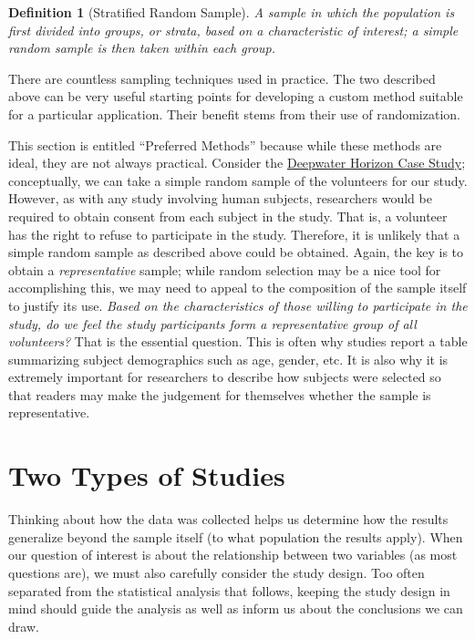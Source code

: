 \documentclass[
]{book}
\theoremstyle{plain}
\theoremstyle{mydefn}
\newtheorem{definition}{Definition}[chapter]
\theoremstyle{myexmpl}
\theoremstyle{remark}
\begin{document}
\begin{definition}[Stratified Random Sample]
\protect\hypertarget{def:defn-stratified-random-sample}{}{\label{def:defn-stratified-random-sample} {} }A sample in which the population is first divided into groups, or strata, based on a characteristic of interest; a simple random sample is then taken within each group.
\end{definition}

There are countless sampling techniques used in practice. The two described above can be very useful starting points for developing a custom method suitable for a particular application. Their benefit stems from their use of randomization.

This section is entitled ``Preferred Methods'' because while these methods are ideal, they are not always practical. Consider the \protect\hyperlink{CaseDeepwater}{Deepwater Horizon Case Study}; conceptually, we can take a simple random sample of the volunteers for our study. However, as with any study involving human subjects, researchers would be required to obtain consent from each subject in the study. That is, a volunteer has the right to refuse to participate in the study. Therefore, it is unlikely that a simple random sample as described above could be obtained. Again, the key is to obtain a \emph{representative} sample; while random selection may be a nice tool for accomplishing this, we may need to appeal to the composition of the sample itself to justify its use. \emph{Based on the characteristics of those willing to participate in the study, do we feel the study participants form a representative group of all volunteers?} That is the essential question. This is often why studies report a table summarizing subject demographics such as age, gender, etc. It is also why it is extremely important for researchers to describe how subjects were selected so that readers may make the judgement for themselves whether the sample is representative.

\hypertarget{two-types-of-studies}{%
\section{Two Types of Studies}\label{two-types-of-studies}}

Thinking about how the data was collected helps us determine how the results generalize beyond the sample itself (to what population the results apply). When our question of interest is about the relationship between two variables (as most questions are), we must also carefully consider the study design. Too often separated from the statistical analysis that follows, keeping the study design in mind should guide the analysis as well as inform us about the conclusions we can draw.
\end{document}
